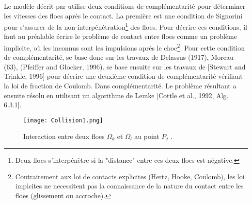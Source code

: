 Le modèle décrit par \parencite[p.5892]{rabatel2015dynamics} utilise deux conditions de complémentarité pour déterminer les vitesses des floes après le contact. La première est une condition de Signorini \parencite{signorini1933sopra} pour s'assurer de la non-interpénétration\footnote{Deux floes s'interpénètre si la "distance" entre ces deux floes est négative.} des floes. Pour décrire ces conditions, il faut au préalable écrire le problème de contact entre floes comme un problème implicite, où les inconnus sont les impulsions après le choc\footnote{Contrairement aux loi de contacts explicites (Hertz, Hooke, Coulomb), les loi implcites ne necessitent pas la connaissance de la nature du contact entre les floes (glissement ou accroche).}. Pour cette condition de complémentarité, \citeauthor{rabatel2015thesis} se base donc sur les travaux de Delassus (1917), Moreau (63), (Pfeiffer and Glocker, 1996). \citeauthor{rabatel2015thesis} se base ensuite sur les travaux de [Stewart and Trinkle, 1996] pour décrire une deuxième condition de complémentarité vérifiant la loi de fraction de Coulomb. Dans \parencite[p.5892]{rabatel2015dynamics}complémentarité. Le problème résultant a ensuite résolu en utilisant un algorithme de Lemke [Cottle et al., 1992, Alg. 6.3.1]. 

\begin{figure}[!h]
    \centering
    \texttt{[image: Collision1.png]}
    \caption{Interaction entre deux floes $\Omega_k$ et $\Omega_l$ au point $P_j$ \parencite[p.26]{rabatel2015thesis}.}
    \label{fig:Collision1}
\end{figure}

